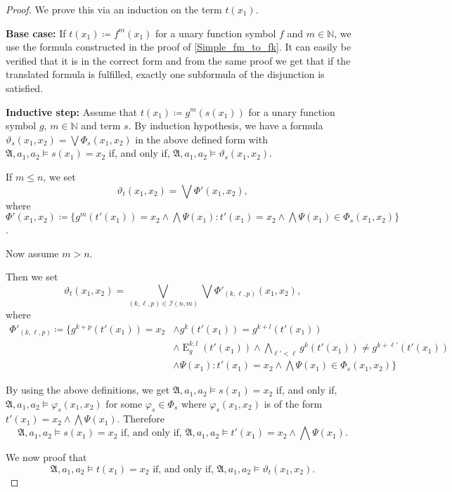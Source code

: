 \documentclass[a4paper,11pt,DIV=15]{scrartcl} %
\renewcommand{\phi}{\varphi}
\theoremstyle{plain}
\theoremstyle{definition}
\renewcommand{\theta}{\vartheta}
\begin{document}
\begin{proof}
	We prove this via an induction on the term $t(x_1)$.
	
	\textbf{Base case:}
	If $t(x_1)\coloneqq f^{m}(x_1)$ for a unary function symbol $f$ and $m\in \mathbb N$, we use the formula constructed in the proof of \cref{Simple_fm_to_fk}.
	It can easily be verified that it is in the correct form and from the same proof we get that if the translated formula is fulfilled, exactly one subformula of the disjunction is satisfied.
	
	\textbf{Inductive step:}
	Assume that $t(x_1)\coloneqq g^m(s(x_1))$ for a unary function symbol $g$, $m\in\mathbb N$ and term $s$.
	By induction hypothesis, we have a formula $\theta_{s}(x_1,x_2)=\bigvee \Phi_s(x_1,x_2)$ in the above defined form with $\mathfrak A,a_1,a_2 \models s(x_1)=x_2$ if, and only if, $\mathfrak A,a_1,a_2\models \theta_{s}(x_1,x_2)$.
	
	If $m\leq n$, we set 
	$$\theta_{t}(x_1,x_2)=\bigvee \Phi'(x_1,x_2),$$
	where $\Phi'(x_1,x_2)\coloneqq\{g^{m}(t'(x_1))=x_2 \land \bigwedge \Psi(x_1) : t'(x_1)=x_2 \land \bigwedge \Psi(x_1)\in \Phi_s(x_1,x_2)\}$.
	
	Now assume $m>n$.
	
	Then we set
	$$\theta_{t}(x_1,x_2)=\bigvee_{(k,\ell,p)\in \mathcal I(n,m)} \bigvee \Phi'_{(k,\ell,p)}(x_1,x_2),$$
	where 
	\begin{align*}
		\Phi'_{(k,\ell,p)}\coloneqq \{g^{k+p}(t'(x_1))=x_2 &\land g^{k}(t'(x_1))=g^{k+l}(t'(x_1)) \\
		& \land \operatorname{E}^{k,l}_g(t'(x_1)) \land \bigwedge_{\ell'<\ell} g^{k}(t'(x_1))\neq g^{k+\ell'}(t'(x_1)) \\
		& \land \Psi(x_1) : t'(x_1)=x_2 \land \bigwedge \Psi(x_1)\in \Phi_s(x_1,x_2)\}
	\end{align*}
	
	By using the above definitions, we get $\mathfrak A,a_1,a_2\models s(x_1)=x_2$ if, and only if, $\mathfrak A,a_1,a_2\models \phi_s(x_1,x_2)$ for some $\phi_s\in\Phi_s$ where $\phi_s(x_1,x_2)$ is of the form $t'(x_1)=x_2 \land \bigwedge \Psi(x_1)$.
	Therefore
	\begin{equation}
		\mathfrak A, a_1,a_2 \models s(x_1)=x_2 \text{ if, and only if, } \mathfrak A,a_1,a_2 \models t'(x_1)=x_2 \land \bigwedge \Psi(x_1).
		\label{Equivalence_s_and_tPsi}
	\end{equation}
	
	We now proof that 
	$$\mathfrak A, a_1,a_2\models t(x_1)=x_2 \text{ if, and only if, } \mathfrak A,a_1,a_2\models \theta_{t}(x_1,x_2).$$
	

\end{proof}
\end{document}
